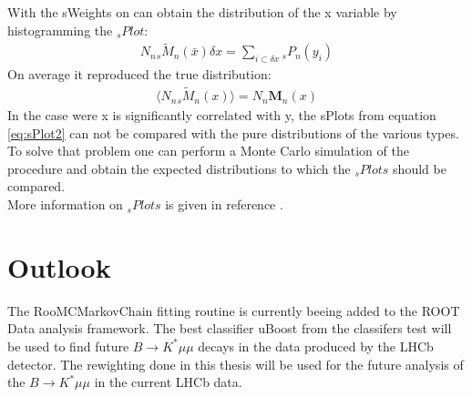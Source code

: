 \documentclass[english]{uzhpub}
\begin{document}
 With the sWeights on can obtain the distribution of the x variable by histogramming the $_s Plot$:
 \begin{align}
  N_n { }_{s} \tilde{M}_n (\bar{x}) \delta x = \sum_{i \subset \delta x} { }_{s} P_n (y_i) \label{eq:sPlot2}
 \end{align}
 On average it reproduced the true distribution:
 \begin{align}
  \langle N_n { }_s \tilde{M}_n (x) \rangle = N_n \textbf{M}_n (x)
 \end{align}
In the case were x is significantly correlated with y, the sPlots from equation \ref{eq:sPlot2} can not be compared with the pure distributions of the various types. To solve that problem one can perform a Monte Carlo simulation of the procedure and obtain the expected distributions to which the $_s Plots$ should be compared. \\
More information on $_s Plots$ is given in reference \cite{bib:sPlot}.

\section{Outlook}
The RooMCMarkovChain fitting routine is currently beeing added \cite{bib:pull} to the ROOT Data analysis framework. The best classifier uBoost from the classifers test will be used to find future $B \rightarrow K^* \mu \mu$ decays in the data produced by the LHCb detector. The rewighting done in this thesis will be used for the future analysis of the $B \rightarrow K^* \mu \mu$ in the current LHCb data.
\end{document}
